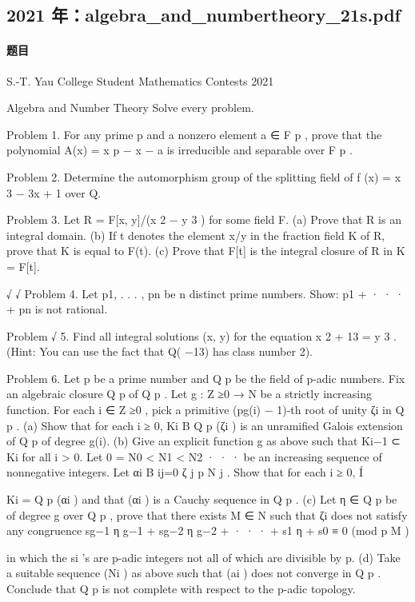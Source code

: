 \documentclass[UTF8,12pt]{ctexart}
\begin{document}
\subsection{2021 年：algebra\_and\_numbertheory\_21s.pdf}
\paragraph{题目}
S.-T. Yau College Student Mathematics Contests 2021

Algebra and Number Theory Solve every problem.

Problem 1. For any prime p and a nonzero element a ∈ F p , prove that the polynomial A(x) = x p − x − a is irreducible and separable over F p .

Problem 2. Determine the automorphism group of the splitting field of f (x) = x 3 − 3x + 1 over Q.

Problem 3. Let R = F[x, y]/(x 2 − y 3 ) for some field F. (a) Prove that R is an integral domain. (b) If t denotes the element x/y in the fraction field K of R, prove that K is equal to F(t). (c) Prove that F[t] is the integral closure of R in K = F[t].

√ √ Problem 4. Let p1, . . . , pn be n distinct prime numbers. Show: p1 + · · · + pn is not rational.

Problem √ 5. Find all integral solutions (x, y) for the equation x 2 + 13 = y 3 . (Hint: You can use the fact that Q( −13) has class number 2).

Problem 6. Let p be a prime number and Q p be the field of p-adic numbers. Fix an algebraic closure Q p of Q p . Let g : Z ≥0 → N be a strictly increasing function. For each i ∈ Z ≥0 , pick a primitive (pg(i) − 1)-th root of unity ζi in Q p . (a) Show that for each i ≥ 0, Ki B Q p (ζi ) is an unramified Galois extension of Q p of degree g(i). (b) Give an explicit function g as above such that Ki−1 ⊂ Ki for all i > 0. Let 0 = N0 < N1 < N2 · · · be an increasing sequence of nonnegative integers. Let αi B ij=0 ζ j p N j . Show that for each i ≥ 0, Í

Ki = Q p (αi ) and that (αi ) is a Cauchy sequence in Q p . (c) Let η ∈ Q p be of degree g over Q p , prove that there exists M ∈ N such that ζi does not satisfy any congruence sg−1 η g−1 + sg−2 η g−2 + · · · + s1 η + s0 ≡ 0 (mod p M )

in which the si ’s are p-adic integers not all of which are divisible by p. (d) Take a suitable sequence (Ni ) as above such that (ai ) does not converge in Q p . Conclude that Q p is not complete with respect to the p-adic topology.
\end{document}
